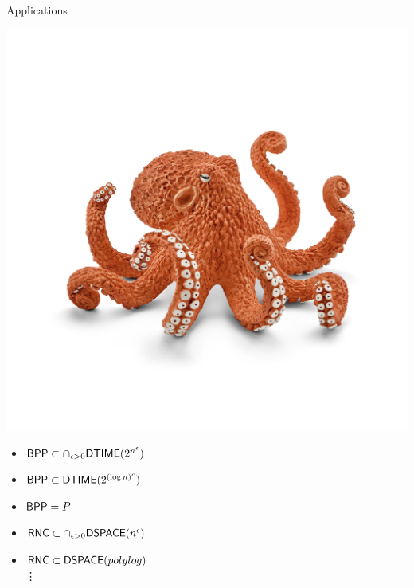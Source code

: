\documentclass[xcolor={table,dvipsnames,usenames}]{beamer}
\begin{document}
\begin{frame}{Applications}
	\begin{minipage}[b]{0.3\textwidth}
	        \begin{center}
		        \includegraphics[width=\columnwidth]{figures/octopus.jpg}
	        \end{center}
	 \end{minipage}
 \begin{minipage}[b]{0.65\textwidth}
 	        \begin{itemize}
				\item $\mathsf{BPP} \subset	\cap_{\epsilon > 0}	\mathsf{DTIME} (2^{n^{\epsilon}})$
				\pause
				\item   $\mathsf{BPP} \subset \mathsf{DTIME} (2^{(\log n)^{c}})$
				\pause
				\item $\mathsf{BPP} = P$
				\pause
				\item $\mathsf{RNC} \subset\cap_{\epsilon > 0}	\mathsf{DSPACE} ({n^{\epsilon}})$
				\pause 
				\item $\mathsf{RNC} \subset \mathsf{DSPACE}(polylog)$\\
				\quad \quad \vdots
 	        \end{itemize}
 	    \end{minipage} 
\end{frame}
\end{document}
